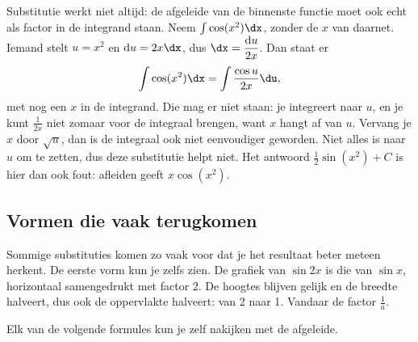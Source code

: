 Substitutie werkt niet altijd: de afgeleide van de binnenste functie moet ook echt als factor in de integrand staan. Neem $\int \cos(x^2)\dx$, zonder de $x$ van daarnet. Iemand stelt $u = x^2$ en $\mathrm{d}u = 2x\dx$, dus $\dx = \dfrac{\mathrm{d}u}{2x}$. Dan staat er
\[ \int \cos(x^2)\dx = \int \frac{\cos u}{2x}\du , \]
met nog een $x$ in de integrand. Die mag er niet staan: je integreert naar $u$, en je kunt $\tfrac{1}{2x}$ niet zomaar voor de integraal brengen, want $x$ hangt af van $u$. Vervang je $x$ door $\sqrt{u}$, dan is de integraal ook niet eenvoudiger geworden. Niet alles is naar $u$ om te zetten, dus deze substitutie helpt niet. Het antwoord $\tfrac12\sin(x^2) + C$ is hier dan ook fout: afleiden geeft $x\cos(x^2)$.

\subsection{Vormen die vaak terugkomen}

Sommige substituties komen zo vaak voor dat je het resultaat beter meteen herkent. De eerste vorm kun je zelfs zien. De grafiek van $\sin 2x$ is die van $\sin x$, horizontaal samengedrukt met factor 2. De hoogtes blijven gelijk en de breedte halveert, dus ook de oppervlakte halveert: van 2 naar 1. Vandaar de factor $\tfrac{1}{a}$.


Elk van de volgende formules kun je zelf nakijken met de afgeleide.

